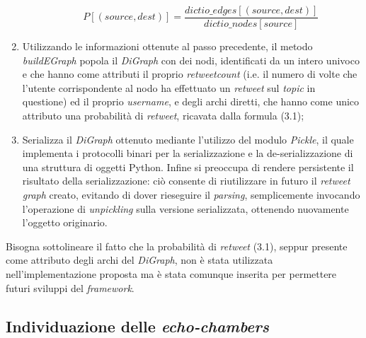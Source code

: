 \begin{enumerate}
\begin{itemize}
\begin{equation}
P[(source,dest)] = \frac{dictio\_edges[(source,dest)]}{dictio\_nodes[source]}
\end{equation}

\end{itemize}
\item Utilizzando le informazioni ottenute al passo precedente, il metodo \textit{buildEGraph} popola il \textit{DiGraph} con dei nodi, identificati da un intero univoco e che hanno come attributi il proprio \textit{retweetcount} (i.e. il numero di volte che l'utente corrispondente al nodo ha effettuato un \textit{retweet} sul \textit{topic} in questione) ed il proprio \textit{username}, e degli archi diretti, che hanno come unico attributo una probabilità di \textit{retweet}, ricavata dalla formula (3.1);

\item Serializza il \textit{DiGraph} ottenuto mediante l'utilizzo del modulo \textit{Pickle}, il quale implementa i protocolli binari per la serializzazione e la de-serializzazione di una struttura di oggetti Python. Infine si preoccupa di rendere persistente il risultato della serializzazione: ciò consente di riutilizzare in futuro il \textit{retweet graph} creato, evitando di dover rieseguire il \textit{parsing}, semplicemente invocando l'operazione di \textit{unpickling} sulla versione serializzata, ottenendo nuovamente l'oggetto originario.  
\end{enumerate}
Bisogna sottolineare il fatto che la probabilità di \textit{retweet} (3.1), seppur presente come attributo degli archi del \textit{DiGraph}, non è stata utilizzata nell'implementazione proposta ma è stata comunque inserita per permettere futuri sviluppi del \textit{framework}.
\\
\subsection{Individuazione delle \textit{echo-chambers}}

